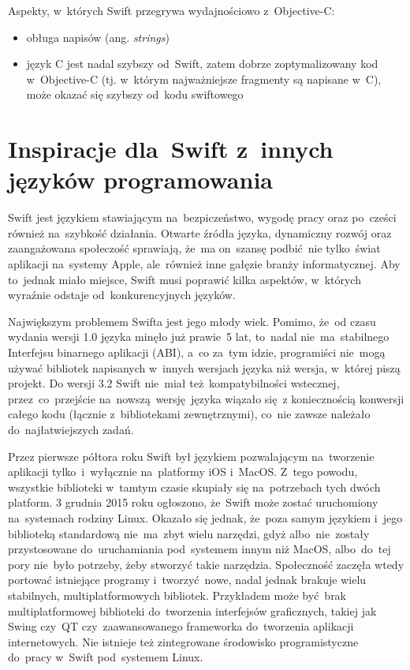 \documentclass[mgr, shortabstract]{iithesis}
\newcommand{\ang}[1]{ang. \textit{#1}}
\begin{document}
Aspekty, w~których Swift przegrywa wydajnościowo z~Objective-C:
\begin{itemize}
    \item obługa napisów (\ang{strings})
    \item język C jest nadal szybszy od~Swift, zatem dobrze zoptymalizowany kod w~Objective-C (tj. w~którym najważniejsze fragmenty są napisane w~C), może okazać się szybszy od~kodu swiftowego
\end{itemize}

\section{Inspiracje dla~Swift z~innych języków programowania}

Swift jest językiem stawiającym na~bezpiczeństwo, wygodę pracy oraz po~cześci również na~szybkość działania. Otwarte źródła języka, dynamiczny rozwój oraz zaangażowana społeczość sprawiają, że~ma on~szansę podbić nie tylko~świat aplikacji na~systemy Apple, ale~również inne gałęzie branży informatycznej. Aby to~jednak miało miejsce, Swift musi poprawić kilka aspektów, w~których wyraźnie odstaje od~konkurencyjnych języków.

Największym problemem Swifta jest jego młody wiek. Pomimo, że~od czasu wydania wersji 1.0 języka minęło już prawie 5 lat, to~nadal nie~ma~stabilnego Interfejsu binarnego aplikacji (ABI), a~co za~tym idzie, programiści nie~mogą używać bibliotek napisanych w~innych wersjach języka niż wersja, w~której piszą projekt. Do wersji 3.2 Swift nie~miał też kompatybilności wstecznej, przez~co~przejście na~nowszą wersję języka wiązało się z koniecznością konwersji całego kodu (łącznie z~bibliotekami zewnętrznymi), co~nie zawsze należało do~najłatwiejszych zadań.

Przez pierwsze półtora roku Swift był językiem pozwalającym na~tworzenie aplikacji tylko~i~wyłącznie na~platformy iOS i~MacOS. Z~tego powodu, wszystkie biblioteki w~tamtym czasie skupiały się na~potrzebach tych dwóch platform. 3 grudnia 2015 roku ogłoszono, że~Swift może zostać uruchomiony na~systemach rodziny Linux. Okazało się jednak, że~poza samym językiem i~jego biblioteką standardową nie~ma~zbyt wielu narzędzi, gdyż albo~nie~zostały przystosowane do~uruchamiania pod~systemem innym niż MacOS, albo~do~tej pory nie~było potrzeby, żeby stworzyć takie narzędzia. Społeczność zaczęła wtedy portować istniejące programy i~tworzyć nowe, nadal jednak brakuje wielu stabilnych, multiplatformowych bibliotek. Przykładem może być brak multiplatformowej biblioteki do~tworzenia interfejsów graficznych, takiej jak Swing czy~QT czy~zaawansowanego frameworka do~tworzenia aplikacji internetowych. Nie istnieje też zintegrowane środowisko programistyczne do~pracy w~Swift pod~systemem Linux.
\end{document}
